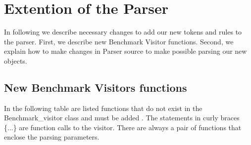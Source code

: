 \documentclass[10pt]{article}
\begin{document}
\section{Extention of the Parser}
  In following we describe necessary changes to add our new tokens and rules to the parser. First, we describe new Benchmark Visitor functions. Second, we explain how to make changes in Parser source to make possible parsing our new objects.
\subsection{New Benchmark Visitors functions}

In the following table are listed functions that do not exist in the Benchmark\_visitor class and must be added . The statements in curly braces \{...\} are function calls to the visitor. There are always a pair of functions that enclose the parsing parameters.
\\ 
\end{document}
